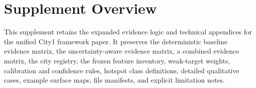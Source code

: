 \section*{Supplement Overview}

This supplement retains the expanded evidence logic and technical appendices for the unified City1 framework paper. It preserves the deterministic baseline evidence matrix, the uncertainty-aware evidence matrix, a combined evidence matrix, the city registry, the frozen feature inventory, weak-target weights, calibration and confidence rules, hotspot class definitions, detailed qualitative cases, example surface maps, file manifests, and explicit limitation notes.

